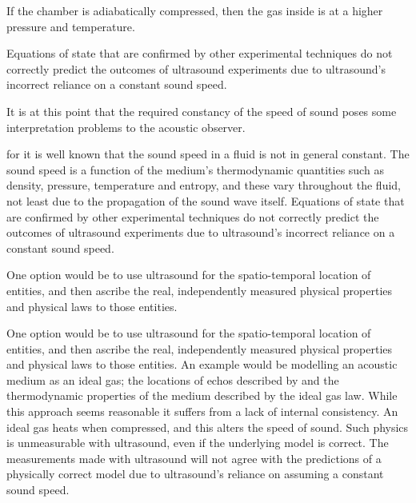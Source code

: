 If the chamber is adiabatically compressed, then the gas inside is at a higher pressure and temperature.




Equations of state that are confirmed by other experimental techniques do not correctly predict the outcomes of ultrasound experiments
due to ultrasound's incorrect reliance on a constant sound speed.


It is at this point that the required constancy of the speed of sound poses some interpretation problems to the acoustic observer.




for it is well known that the sound speed in a fluid is not in general constant.
The sound speed is a function of the medium's thermodynamic quantities such as  density, pressure, temperature and entropy,
and these vary throughout the fluid, not least due to the propagation of the sound wave itself.
Equations of state that are confirmed by other experimental techniques do not correctly predict the outcomes of ultrasound experiments
due to ultrasound's incorrect reliance on a constant sound speed.






One option would be to use ultrasound for the spatio-temporal location of entities, and then ascribe the real, independently measured physical properties and physical laws to those entities.



One option would be to use ultrasound for the spatio-temporal location of entities, and then ascribe the real, independently measured physical properties and physical laws to those entities.
An example would be modelling an acoustic medium as an ideal gas; the locations of echos described by  and the thermodynamic properties of the medium described by the ideal gas law.
While this approach seems reasonable it suffers from a lack of internal consistency. 
An ideal gas heats when compressed, and this alters the speed of sound.  
Such physics is unmeasurable with ultrasound, even if the underlying model is correct.
The measurements made with ultrasound will not agree with the predictions of a physically correct model due to ultrasound's reliance on assuming a constant sound speed.


